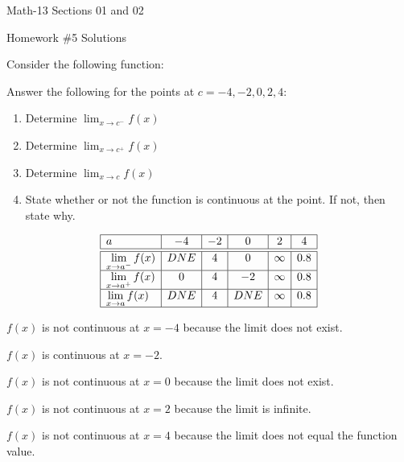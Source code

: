 \documentclass[letterpaper,12pt,fleqn]{article}
\begin{document}
\begin{center}
  \large
  Math-13 Sections 01 and 02

  \Large
  Homework \#5 Solutions
\end{center}

Consider the following function:

\bigskip

\begin{center}
\end{center}

\bigskip

Answer the following for the points at \(c=-4, -2, 0, 2, 4\):

\begin{enumerate}[label={\alph*)}]
  \item Determine \(\displaystyle\lim_{x\to c^-}f(x)\)
  \item Determine \(\displaystyle\lim_{x\to c^+}f(x)\)
  \item Determine \(\displaystyle\lim_{x\to c}f(x)\)
  \item State whether or not the function is continuous at the point.  If not, then state why.
\end{enumerate}

\[\begin{array}{|l|c|c|c|c|c|}
\hline
a & -4 & -2 & 0 & 2 & 4 \\
\hline
\hline
\displaystyle\lim_{x\to a^-}f(x) & DNE & 4 & 0 & \infty & 0.8 \\
\hline
\displaystyle\lim_{x\to a^+}f(x) & 0 & 4 & -2 & \infty & 0.8 \\
\hline
\displaystyle\lim_{x\to a}f(x) & DNE & 4 & DNE & \infty & 0.8 \\
\hline
\end{array}\]

\(f(x)\) is not continuous at \(x=-4\) because the limit does not exist.

\(f(x)\) is continuous at \(x=-2\).

\(f(x)\) is not continuous at \(x=0\) because the limit does not exist.

\(f(x)\) is not continuous at \(x=2\) because the limit is infinite.

\(f(x)\) is not continuous at \(x=4\) because the limit does not equal the function value.
\end{document}
